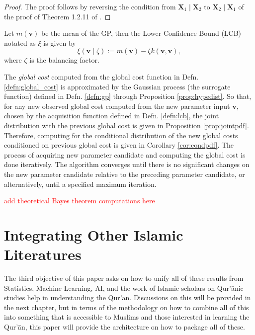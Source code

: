 \begin{proof}
    The proof follows by reversing the condition from $\mathbf{X}_1\mid\mathbf{X}_2$ to $\mathbf{X}_2\mid\mathbf{X}_1$ of the proof of Theorem 1.2.11 of \cite{muirhead2005}.
\end{proof}
\begin{defn}\label{defn:lcb}
    Let $m(\mathbf{v})$ be the mean of the GP, then the Lower Confidence Bound (LCB) notated as $\xi$ is given by
    \begin{equation}
        \xi(\mathbf{v}\mid\zeta):=m(\mathbf{v})-\zeta k(\mathbf{v},\mathbf{v}),
    \end{equation}
    where $\zeta$ is the balancing factor.
\end{defn}
The \textit{global cost} computed from the global cost function in Defn. \ref{defn:global_cost} is approximated by the Gaussian process (the surrogate function) defined in Defn. \ref{defn:gp} through Proposition \ref{prop:hypedist}. So that, for any new observed global cost computed from the new parameter input $\mathbf{v}$, chosen by the acquisition function defined in Defn. \ref{defn:lcb}, the joint distribution with the previous global cost is given in Proposition \ref{prop:jointpdf}. Therefore, computing for the conditional distribution of the new global costs conditioned on previous global cost is given in Corollary \ref{cor:condpdf}. The process of acquiring new parameter candidate and computing the global cost is done iteratively. The algorithm converges until there is no significant changes on the new parameter candidate relative to the preceding parameter candidate, or alternatively, until a specified maximum iteration.
\begin{center}
    \textcolor{red}{add theoretical Bayes theorem computations here}
\end{center}
\section{Integrating Other Islamic Literatures}
The third objective of this paper asks on how to unify all of these results from Statistics, Machine Learning, AI, and the work of Islamic scholars on Qur'\=anic studies help in understanding the Qur'\=an. Discussions on this will be provided in the next chapter, but in terms of the methodology on how to combine all of this into something that is accessible to Muslims and those interested in learning the Qur'\=an, this paper will provide the architecture on how to package all of these.

